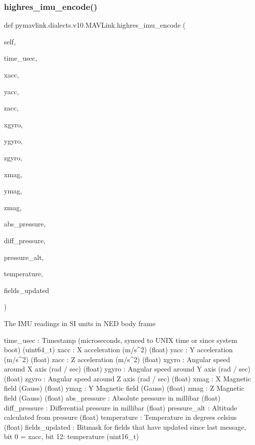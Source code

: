 \begin{DoxyVerb}
\begin{DoxyVerb}
\subsubsection{\texorpdfstring{highres\+\_\+imu\+\_\+encode()}{highres\_imu\_encode()}}
{\footnotesize\ttfamily def pymavlink.\+dialects.\+v10.\+M\+A\+V\+Link.\+highres\+\_\+imu\+\_\+encode (\begin{DoxyParamCaption}\item[{}]{self,  }\item[{}]{time\+\_\+usec,  }\item[{}]{xacc,  }\item[{}]{yacc,  }\item[{}]{zacc,  }\item[{}]{xgyro,  }\item[{}]{ygyro,  }\item[{}]{zgyro,  }\item[{}]{xmag,  }\item[{}]{ymag,  }\item[{}]{zmag,  }\item[{}]{abs\+\_\+pressure,  }\item[{}]{diff\+\_\+pressure,  }\item[{}]{pressure\+\_\+alt,  }\item[{}]{temperature,  }\item[{}]{fields\+\_\+updated }\end{DoxyParamCaption})}

\begin{DoxyVerb}The IMU readings in SI units in NED body frame

time_usec                 : Timestamp (microseconds, synced to UNIX time or since system boot) (uint64_t)
xacc                      : X acceleration (m/s^2) (float)
yacc                      : Y acceleration (m/s^2) (float)
zacc                      : Z acceleration (m/s^2) (float)
xgyro                     : Angular speed around X axis (rad / sec) (float)
ygyro                     : Angular speed around Y axis (rad / sec) (float)
zgyro                     : Angular speed around Z axis (rad / sec) (float)
xmag                      : X Magnetic field (Gauss) (float)
ymag                      : Y Magnetic field (Gauss) (float)
zmag                      : Z Magnetic field (Gauss) (float)
abs_pressure              : Absolute pressure in millibar (float)
diff_pressure             : Differential pressure in millibar (float)
pressure_alt              : Altitude calculated from pressure (float)
temperature               : Temperature in degrees celsius (float)
fields_updated            : Bitmask for fields that have updated since last message, bit 0 = xacc, bit 12: temperature (uint16_t)\end{DoxyVerb}
 \mbox{\label{classpymavlink_1_1dialects_1_1v10_1_1MAVLink_ab326b32e6716cea70b25530d7b872683}} 

\end{DoxyVerb}
\end{DoxyVerb}
